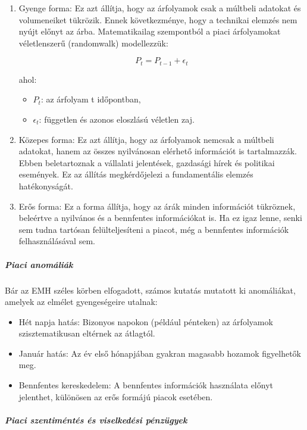 \documentclass[11pt]{article}
\providecommand{\tightlist}{%
      \setlength{\itemsep}{0pt}\setlength{\parskip}{0pt}}
\begin{document}
\begin{enumerate}
\def\labelenumi{\arabic{enumi}.}
\item
  Gyenge forma: Ez azt állítja, hogy az árfolyamok csak a múltbeli
  adatokat és volumeneiket tükrözik. Ennek következménye, hogy a
  technikai elemzés nem nyújt előnyt az árba. Matematikailag szempontból
  a piaci árfolyamokat véletlenszerű (randomwalk) modellezzük:

  \[P_t = P_{t-1} + \epsilon_t\]

  ahol:

  \begin{itemize}
  \tightlist
  \item
    \(P_t\): az árfolyam t időpontban,
  \item
    \(\epsilon_t\): független és azonos eloszlású véletlen zaj.
  \end{itemize}
\item
  Közepes forma: Ez azt állítja, hogy az árfolyamok nemcsak a múltbeli
  adatokat, hanem az összes nyilvánosan elérhető információt is
  tartalmazzák. Ebben beletartoznak a vállalati jelentések, gazdasági
  hírek és politikai események. Ez az állítás megkérdőjelezi a
  fundamentális elemzés hatékonyságát.
\item
  Erős forma: Ez a forma állítja, hogy az árák minden információt
  tükröznek, beleértve a nyilvános és a bennfentes információkat is. Ha
  ez igaz lenne, senki sem tudna tartósan felülteljesíteni a piacot, még
  a bennfentes információk felhasználásával sem.
\end{enumerate}

\subparagraph{Piaci anomáliák}\label{piaci-anomuxe1liuxe1k}

Bár az EMH széles körben elfogadott, számos kutatás mutatott ki
anomáliákat, amelyek az elmélet gyengeségeire utalnak:

\begin{itemize}
\tightlist
\item
  Hét napja hatás: Bizonyos napokon (például pénteken) az árfolyamok
  szisztematikusan eltérnek az átlagtól.
\item
  Január hatás: Az év első hónapjában gyakran magasabb hozamok
  figyelhetők meg.
\item
  Bennfentes kereskedelem: A bennfentes információk használata előnyt
  jelenthet, különösen az erős formájú piacok esetében.
\end{itemize}

\subparagraph{Piaci szentiméntés és viselkedési
pénzügyek}\label{piaci-szentimuxe9ntuxe9s-uxe9s-viselkeduxe9si-puxe9nzuxfcgyek}
\end{document}
